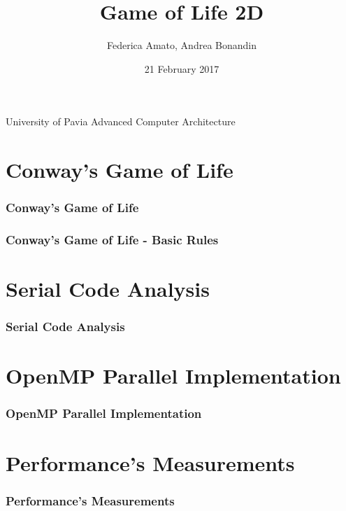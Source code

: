 \documentclass{beamer}
\begin{document}
\title{Game of Life 2D}
\author{Federica Amato, Andrea Bonandin}
\date{21 February 2017}

\begin{frame}
	\begin{center}
		\Large{University of Pavia \break
		Advanced Computer Architecture}
	\end{center}
	\titlepage
\end{frame}

\section{Conway's Game of Life}
\begin{frame}
	\frametitle{Conway's Game of Life}
\end{frame}

\begin{frame}
	\frametitle{Conway's Game of Life - Basic Rules}
\end{frame}

\section{Serial Code Analysis}
\begin{frame}
	\frametitle{Serial Code Analysis}
\end{frame}

\section{OpenMP Parallel Implementation}
\begin{frame}
	\frametitle{OpenMP Parallel Implementation}
\end{frame}

\section{Performance's Measurements}
\begin{frame}
	\frametitle{Performance's Measurements}
\end{frame}
\end{document}
